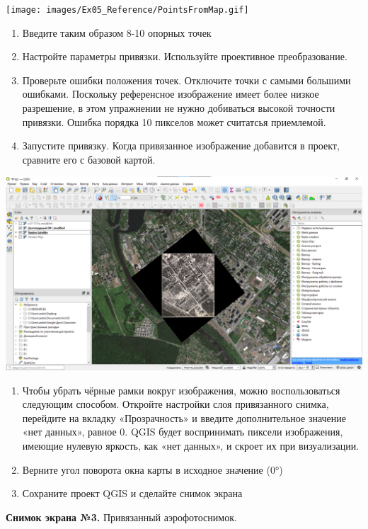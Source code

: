 \documentclass[
  12pt,
]{book}
\begin{document}
\texttt{[image: images/Ex05\_Reference/PointsFromMap.gif]}

\begin{enumerate}
\def\labelenumi{\arabic{enumi}.}
\setcounter{enumi}{6}
\item
  Введите таким образом 8-10 опорных точек
\item
  Настройте параметры привязки. Используйте проективное преобразование.
\item
  Проверьте ошибки положения точек. Отключите точки с самыми большими ошибками. Поскольку референсное изображение имеет более низкое разрешение, в этом упражнении не нужно добиваться высокой точности привязки. Ошибка порядка 10 пикселов может считатсья приемлемой.
\item
  Запустите привязку. Когда привязанное изображение добавится в проект, сравните его с базовой картой.
\end{enumerate}

\includegraphics{images/Ex05_Reference/RasterReference8.png}

\begin{enumerate}
\def\labelenumi{\arabic{enumi}.}
\setcounter{enumi}{10}
\item
  Чтобы убрать чёрные рамки вокруг изображения, можно воспользоваться следующим способом. Откройте настройки слоя привязанного снимка, перейдите на вкладку «Прозрачность» и введите дополнительное значение «нет данных», равное 0. QGIS будет воспринимать пиксели изображения, имеющие нулевую яркость, как «нет данных», и скроет их при визуализации.
\item
  Верните угол поворота окна карты в исходное значение (0°)
\item
  Сохраните проект QGIS и сделайте снимок экрана
\end{enumerate}

\textbf{Снимок экрана №3.} Привязанный аэрофотоснимок.
\end{document}
